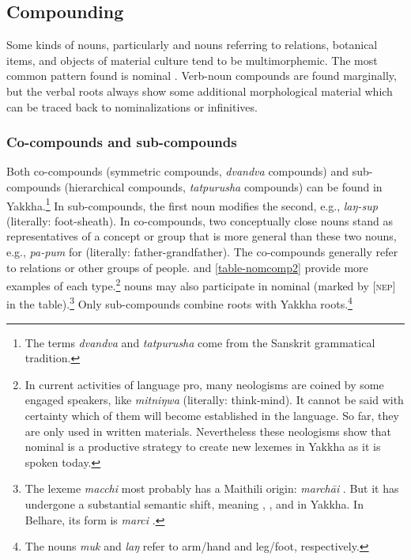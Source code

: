 \subsection{Compounding}\label{lex-noun-2}

Some kinds of nouns, particularly  and nouns referring to  relations, botanical items, and objects of material culture tend to be multimorphemic. The most common pattern found is nominal . Verb-noun compounds are found marginally, but the verbal roots always show some  additional morphological material which can be traced back to nominalizations or infinitives. 

\subsubsection{Co-compounds and sub-compounds}

Both co-compounds (symmetric compounds, \emph{dvandva} compounds) and sub-com\-pounds (hierarchical compounds, \emph{tatpurusha} compounds) can be found in Yakkha.\footnote{The terms \emph{dvandva} and \emph{tatpurusha} come from the Sanskrit grammatical tradition.} In sub-compounds, the first noun modifies the second, e.g., \emph{laŋ-sup}  (literally: foot-sheath). In co-compounds, two conceptually close nouns stand as representatives of a concept or group that is more general than these two nouns, e.g., \emph{pa-pum} for  (literally: father-grandfather). The co-compounds generally refer to  relations or other groups of people.  and \ref{table-nomcomp2} provide more examples of each type.\footnote{In current activities of language pro, many neologisms are coined by some engaged speakers, like \emph{mitniŋwa}  (literally: think-mind). It cannot be said with certainty which of them will become established in the language. So far, they are only used in written materials. Nevertheless these neologisms show that nominal  is a productive strategy to create new lexemes in Yakkha as it is spoken today.}  nouns may also participate in nominal  (marked by [\textsc{nep}] in the table).\footnote{The lexeme \emph{macchi} most probably has a Maithili origin: \emph{marchāi} . But it has undergone a substantial semantic shift, meaning , , and  in Yakkha. In Belhare, its form is \emph{marci} \citep{Bickel1997Dictionary}.} Only sub-compounds combine  roots with Yakkha roots.\footnote{The nouns \emph{muk} and \emph{laŋ} refer to arm/hand  and leg/foot, respectively.}

